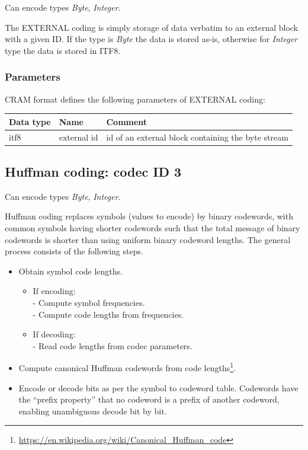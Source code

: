 \documentclass[a4paper]{article}
\begin{document}
Can encode types \textit{Byte}, \textit{Integer}.

The EXTERNAL coding is simply storage of data verbatim to an external block with a given ID.
If the type is \textit{Byte} the data is stored as-is, otherwise for \textit{Integer} type the data is stored in ITF8.

\subsubsection*{Parameters}

CRAM format defines the following parameters of EXTERNAL coding: 

\begin{tabular}{|>{\raggedright}p{100pt}|>{\raggedright}p{100pt}|>{\raggedright}p{230pt}|}
\hline
\textbf{Data type} & \textbf{Name} & \textbf{Comment}
\tabularnewline
\hline
itf8 & external id & id of an external block containing the byte stream\tabularnewline
\hline
\end{tabular}

\subsection{Huffman coding: codec ID 3}

Can encode types \textit{Byte}, \textit{Integer}.

Huffman coding replaces symbols (values to encode) by binary codewords, with common symbols having shorter codewords such that the total message of binary codewords is shorter than using uniform binary codeword lengths.
The general process consists of the following steps.

\begin{itemize}
\item Obtain symbol code lengths.
\begin{itemize}
\item If encoding:\\
- Compute symbol frequencies.\\
- Compute code lengths from frequencies.
\item If decoding:\\
- Read code lengths from codec parameters.
\end{itemize}

\item Compute canonical Huffman codewords from code lengths\footnote{\url{https://en.wikipedia.org/wiki/Canonical_Huffman_code}}.

\item Encode or decode bits as per the symbol to codeword table.
Codewords have the ``prefix property'' that no codeword is a prefix of another codeword, enabling unambiguous decode bit by bit.
\end{itemize}
\end{document}
